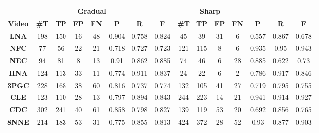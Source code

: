 \documentclass[journal]{IEEEtran}
\begin{document}
\begin{table*}[h]
\centering

\begin{tabular}{|c|c|c|c|c|c|c|c|c|c|c|c|c|c|c|}
\hline
 & \multicolumn{6}{c|}{\textbf{Gradual}} & \multicolumn{6}{c|}{\textbf{Sharp}}  \\ \hline
\textbf{Video}                & \textbf{\#T} & \textbf{TP} & \textbf{FP} & \textbf{FN} & \textbf{P} & \textbf{R} & \textbf{F} & \textbf{\#T} & \textbf{TP} & \textbf{FP} & \textbf{FN} & \textbf{P} & \textbf{R} & \textbf{F} \\ \hline
\textbf{LNA}          & 198           & 150         & 16          & 48          & 0.904      & 0.758      & 0.824      & 45            & 39          & 31          & 6           & 0.557      & 0.867      & 0.678      \\ \hline
\textbf{NFC}     & 77            & 56          & 22          & 21          & 0.718      & 0.727      & 0.723      & 121           & 115         & 8           & 6           & 0.935      & 0.95       & 0.943      \\ \hline
\textbf{NEC}     & 94            & 81          & 8           & 13          & 0.91       & 0.862      & 0.885      & 74            & 46          & 6           & 28          & 0.885      & 0.622      & 0.73       \\ \hline
\textbf{HNA}         & 124           & 113         & 33          & 11          & 0.774      & 0.911      & 0.837      & 24            & 22          & 6           & 2           & 0.786      & 0.917      & 0.846      \\ \hline
\textbf{3PGC} & 228           & 168         & 38          & 60          & 0.816      & 0.737      & 0.774      & 132           & 105         & 41          & 27          & 0.719      & 0.795      & 0.755      \\ \hline
\textbf{CLE}       & 123           & 110         & 28          & 13          & 0.797      & 0.894      & 0.843      & 244           & 223         & 14          & 21          & 0.941      & 0.914      & 0.927      \\ \hline
\textbf{CDC}         & 302           & 241         & 40          & 61          & 0.858      & 0.798      & 0.827      & 139           & 119         & 53          & 20          & 0.692      & 0.856      & 0.765      \\ \hline
\textbf{8NNE}    & 214           & 183         & 53          & 31          & 0.775      & 0.855      & 0.813      & 424           & 372         & 28          & 52          & 0.93       & 0.877      & 0.903      \\ \hline

\end{tabular}
\end{table*}
\end{document}
